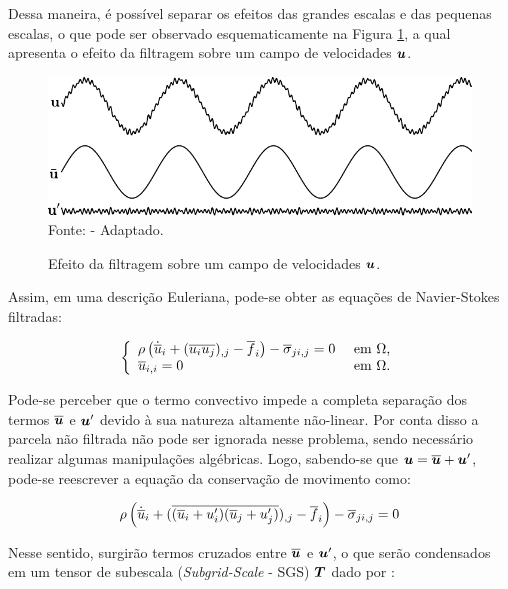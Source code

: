 Dessa maneira, é possível separar os efeitos das grandes escalas e das pequenas escalas, o que pode ser observado esquematicamente na Figura \ref{fig:EfeitoFiltragem}, a qual apresenta o efeito da filtragem sobre um campo de velocidades $\boldsymbol{u}$.

\begin{figure}[h]
    \centering
    \caption{Efeito da filtragem sobre um campo de velocidades $\boldsymbol{u}$.}
    \includegraphics[width=.75\linewidth]{Figuras/efeito_filtragem.pdf}
    \\Fonte:  - Adaptado.
    \label{fig:EfeitoFiltragem}
\end{figure}

Assim, em uma descrição Euleriana, pode-se obter as equações de Navier-Stokes filtradas:

\begin{equation}
    \left\{
    \begin{array}{ll}
        \rho\left({\dot{\overline{u}}_i+(\overline{u_iu_j})_{,j}-\overline{f}_i}\right)-\overline{\sigma}_{ji,j}=0 & \text{ em }\Omega\text{,} \\
        \overline{u}_{i,i}=0                                                                       & \text{ em }\Omega\text{.}
    \end{array}
    \right.
\end{equation}

Pode-se perceber que o termo convectivo impede a completa separação dos termos $\overline{\boldsymbol{u}}$ e $\boldsymbol{u}'$ devido à sua natureza altamente não-linear. Por conta disso a parcela não filtrada não pode ser ignorada nesse problema, sendo necessário realizar algumas manipulações algébricas. Logo, sabendo-se que $\boldsymbol{u}=\overline{\boldsymbol{u}}+\boldsymbol{u}'$, pode-se reescrever a equação da conservação de movimento como:

\begin{equation}
    \rho\left({\dot{\overline{u}}_i+(\overline{(\overline{u}_i+u'_i)(\overline{u}_j+u'_j)})_{,j}-\overline{f}_i}\right)-\overline{\sigma}_{ji,j}=0
\end{equation}

Nesse sentido, surgirão termos cruzados entre $\overline{\boldsymbol{u}}$ e $\boldsymbol{u}'$, o que serão condensados em um tensor de subescala (\textit{Subgrid-Scale} - SGS) $\boldsymbol{T}$ dado por \cite{piomelli1999large,hughes2000large}:

